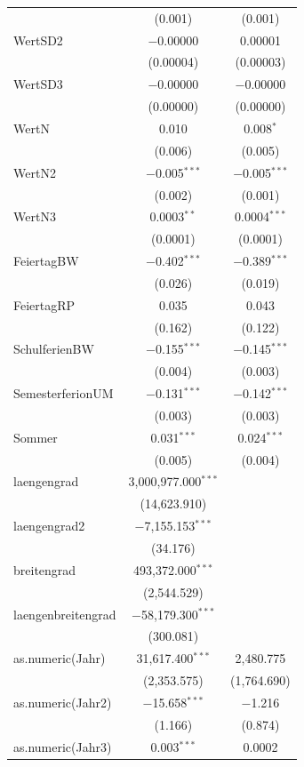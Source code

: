 \documentclass[a4paper,12pt]{thesis}
\begin{document}
\begin{longtable}{@{\extracolsep{-5pt}}lcc}
		& (0.001) & (0.001) \\ 
		WertSD2 & $-$0.00000 & 0.00001 \\ 
		& (0.00004) & (0.00003) \\ 
		WertSD3 & $-$0.00000 & $-$0.00000 \\ 
		& (0.00000) & (0.00000) \\ 
		WertN & 0.010 & 0.008$^{*}$ \\ 
		& (0.006) & (0.005) \\ 
		WertN2 & $-$0.005$^{***}$ & $-$0.005$^{***}$ \\ 
		& (0.002) & (0.001) \\ 
		WertN3 & 0.0003$^{**}$ & 0.0004$^{***}$ \\ 
		& (0.0001) & (0.0001) \\ 
		FeiertagBW & $-$0.402$^{***}$ & $-$0.389$^{***}$ \\ 
		& (0.026) & (0.019) \\ 
		FeiertagRP & 0.035 & 0.043 \\ 
		& (0.162) & (0.122) \\ 
		SchulferienBW & $-$0.155$^{***}$ & $-$0.145$^{***}$ \\ 
		& (0.004) & (0.003) \\ 
		SemesterferionUM & $-$0.131$^{***}$ & $-$0.142$^{***}$ \\ 
		& (0.003) & (0.003) \\ 
		Sommer & 0.031$^{***}$ & 0.024$^{***}$ \\ 
		& (0.005) & (0.004) \\ 
		laengengrad & 3,000,977.000$^{***}$ &  \\ 
		& (14,623.910) &  \\ 
		laengengrad2 & $-$7,155.153$^{***}$ &  \\ 
		& (34.176) &  \\ 
		breitengrad & 493,372.000$^{***}$ &  \\ 
		& (2,544.529) &  \\ 
		laengenbreitengrad & $-$58,179.300$^{***}$ &  \\ 
		& (300.081) &  \\ 
		as.numeric(Jahr) & 31,617.400$^{***}$ & 2,480.775 \\ 
		& (2,353.575) & (1,764.690) \\ 
		as.numeric(Jahr2) & $-$15.658$^{***}$ & $-$1.216 \\ 
		& (1.166) & (0.874) \\ 
		as.numeric(Jahr3) & 0.003$^{***}$ & 0.0002 \\ 

\end{longtable}
\end{document}
